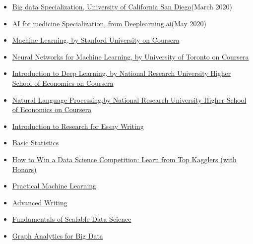 \documentclass[letterpaper,MMMyyyy,nonstopmode]{simpleresumecv}
\begin{document}
\begin{Body}
\begin{itemize}
\begin{itemize}
      \item \href {https://coursera.org/share/2e19ff0d0105de605193e29661a7458d}{Big data Specialization, University of California San Diego}(March 2020)

      \item \href {https://coursera.org/share/2e19ff0d0105de605193e29661a7458d}{AI for medicine Specialization, from Deeplearning.ai}(May 2020)
        
        
         \item  \href {https://www.coursera.org/learn/machine-learning}{Machine Learning, by Stanford University on Coursera}
       	  
        \item \href {https://www.coursera.org/learn/neural-networks}{Neural Networks for Machine Learning, by University of Toronto on Coursera}
        

         \item \href{https://www.coursera.org/learn/intro-to-deep-learning}{Introduction to Deep Learning, by National Research University Higher School of Economics on Coursera}
         
       \item \href{https://www.coursera.org/account/accomplishments/certificate/3QC9VVKDHVYD}{Natural Language Processing,by National Research University Higher School of Economics on Coursera}
       
       \item\href{https://www.coursera.org/account/accomplishments/certificate/RGJ87CLXQTNV}{Introduction to Research for Essay Writing}
       
       \item \href{https://www.coursera.org/account/accomplishments/certificate/35UZFCGDFMM5}{Basic Statistics}
       \item \href{https://www.coursera.org/account/accomplishments/certificate/VB32F5YFWLY5}{How to Win a Data Science Competition: Learn from Top Kagglers (with Honors)}
       \item \href{https://www.coursera.org/account/accomplishments/certificate/A4XCM3ZN73ES}{Practical Machine Learning}
       \item \href{https://www.coursera.org/account/accomplishments/certificate/7VVUS8ZEKXCK}{Advanced Writing}
       \item \href{https://www.coursera.org/account/accomplishments/certificate/W2VSLW8B6VSF}{Fundamentals of Scalable Data Science}
       \item \href{https://www.coursera.org/account/accomplishments/certificate/VFYNXNR8UEMR}{Graph Analytics for Big Data}
    

\end{itemize}
\end{itemize}
\end{Body}
\end{document}
